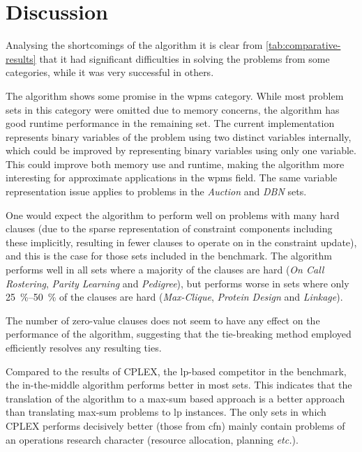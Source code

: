 \section{Discussion}
Analysing the shortcomings of the algorithm it is clear from \cref{tab:comparative-results} that it had significant difficulties in solving the problems from some categories, while it was very successful in others.

The algorithm shows some promise in the \gls{wpms} category.
While most problem sets in this category were omitted due to memory concerns, the algorithm has good runtime performance in the remaining set.
The current implementation represents binary variables of the problem using two distinct variables internally, which could be improved by representing binary variables using only one variable.
This could improve both memory use and runtime, making the algorithm more interesting for approximate applications in the \gls{wpms} field.
The same variable representation issue applies to problems in the \emph{Auction} and \emph{DBN} sets.

One would expect the algorithm to perform well on problems with many hard clauses (due to the sparse representation of constraint components including these implicitly, resulting in fewer clauses to operate on in the constraint update), and this is the case for those sets included in the benchmark.
The algorithm performs well in all sets where a majority of the clauses are hard (\emph{On Call Rostering}, \emph{Parity Learning} and \emph{Pedigree}), but performs worse in sets where only \SIrange{25}{50}{\percent} of the clauses are hard (\emph{Max-Clique}, \emph{Protein Design} and \emph{Linkage}).

The number of zero-value clauses does not seem to have any effect on the performance of the algorithm, suggesting that the tie-breaking method employed efficiently resolves any resulting ties.

Compared to the results of CPLEX, the \gls{lp}-based competitor in the benchmark, the in-the-middle algorithm performs better in most sets.
This indicates that the translation of the algorithm to a max-sum based approach is a better approach than translating max-sum problems to \gls{lp} instances.
The only sets in which CPLEX performs decisively better (those from \gls{cfn}) mainly contain problems of an operations research character (resource allocation, planning \emph{etc.}).

